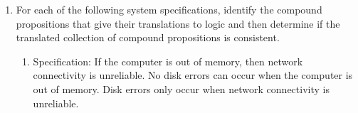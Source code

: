 \documentclass[12pt, oneside]{article}
\begin{document}
\begin{enumerate}
\begin{enumerate}
\begin{enumerate}
\item ``If you try to run Zoom while your computer is running many applications,
the video is likely to be choppy and laggy." $t$ is ``you run Zoom while your
computer is running many applications'', $c$ is ``the video is likely to be choppy'',
$g$ is ``the video is likely to be laggy''
\begin{multicols}{2}
    \begin{enumerate}
    \item[] $t \to (c \land g)$
    \item[] $(c \land g) \to t$
    \item[] $(c \land g) \leftrightarrow t$
    \item[] $t \oplus (c \land g)$
\end{enumerate}
\end{multicols}
\item ``To connect wirelessly on campus without logging in you need to use
the UCSD-Guest network."  $c$ is ``connect wirelessly 
on campus'', $g$ is ``logging in'', and $u$ is ``use UCSD-Guest network''.
\begin{multicols}{2}
    \begin{enumerate}
    \item[] $c \land \lnot g \land u$
    \item[] $(c \land \lnot g) \lor u$
    \item[] $(c \land \lnot g) \oplus u$
    \item[] $(c \land \lnot g) \to u$
    \item[] $u \to (c \land \lnot g)$
    \item[] $u \leftrightarrow (c \land \lnot g)$
\end{enumerate}
\end{multicols}
\end{enumerate}
     \newpage
    \item 

For each of  the following  system specifications, 
identify the compound propositions  that give their
translations to logic  and then determine if the
translated collection  of compound
propositions is consistent.

\begin{enumerate}
    \item Specification: If the computer is out of memory, then network connectivity is unreliable. No disk errors can occur when the computer is out of memory. Disk
    errors only occur when network connectivity is unreliable.
    

\end{enumerate}
\end{enumerate}
\end{enumerate}
\end{document}
